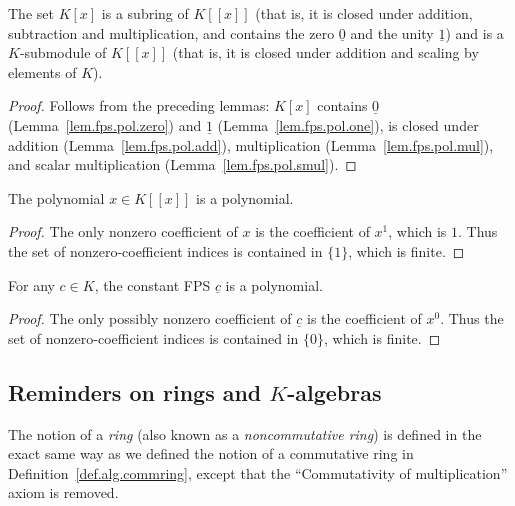 \begin{theorem}
\label{thm.fps.pol.ring}
\leantarget
\leanok
The set $K\left[  x\right]  $ is a subring of
$K\left[  \left[  x\right]  \right]  $ (that is, it is closed under addition,
subtraction and multiplication, and contains the zero $\underline{0}$ and the
unity $\underline{1}$) and is a $K$-submodule of $K\left[  \left[  x\right]
\right]  $ (that is, it is closed under addition and scaling by elements of
$K$).
\end{theorem}

\begin{proof}
Follows from the preceding lemmas: $K[x]$ contains $\underline{0}$
(Lemma~\ref{lem.fps.pol.zero}) and $\underline{1}$
(Lemma~\ref{lem.fps.pol.one}), is closed under addition
(Lemma~\ref{lem.fps.pol.add}), multiplication (Lemma~\ref{lem.fps.pol.mul}),
and scalar multiplication (Lemma~\ref{lem.fps.pol.smul}).
\end{proof}

\begin{lemma}
\label{lem.fps.pol.X}
\leanhelper
\leanok
The polynomial $x\in K\left[\left[x\right]\right]$ is a polynomial.
\end{lemma}

\begin{proof}
\leanok
The only nonzero coefficient of $x$ is the coefficient of $x^1$, which is $1$.
Thus the set of nonzero-coefficient indices is contained in $\{1\}$, which is
finite.
\end{proof}

\begin{lemma}
\label{lem.fps.pol.C}
\leanhelper
\leanok
For any $c\in K$, the constant FPS $\underline{c}$ is a polynomial.
\end{lemma}

\begin{proof}
\leanok
The only possibly nonzero coefficient of $\underline{c}$ is the coefficient of
$x^0$. Thus the set of nonzero-coefficient indices is contained in $\{0\}$,
which is finite.
\end{proof}

\subsection{Reminders on rings and $K$-algebras}

\begin{definition}
\label{def.alg.ring}
\leantarget
\leanok
The notion of a \emph{ring} (also known as a \emph{noncommutative ring}) is
defined in the exact same way as we defined the notion of a commutative ring in
Definition~\ref{def.alg.commring}, except that the ``Commutativity of
multiplication'' axiom is removed.
\end{definition}


